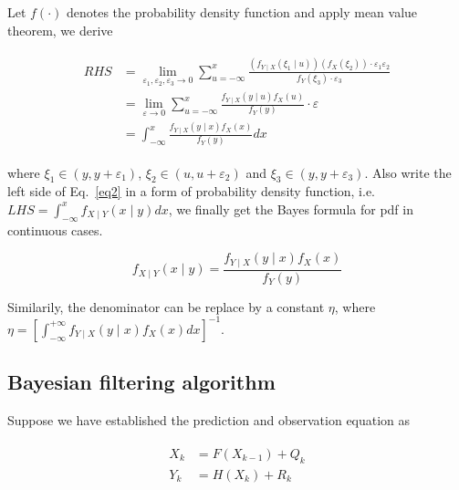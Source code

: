 \documentclass[conference]{IEEEtran}
\begin{document}
	Let $f(\cdot )$ denotes the probability density function and apply mean value theorem, we derive
	
	\begin{equation}
	\begin{split}
	\begin{aligned}
	RHS&=\lim_{\varepsilon_{1}, \varepsilon_{2}, \varepsilon_{3} \rightarrow 0}\sum_{u=-\infty}^{x} \frac{(f_{Y\mid X}(\xi _{1}\mid u)) (f_{X}(\xi _{2}))\cdot \varepsilon_{1} \varepsilon_{2}}{f_{Y}
		(\xi _{3})\cdot \varepsilon_{3}}\\
	&=\lim_{\varepsilon \rightarrow 0}\sum_{u=-\infty}^{x}\frac{f_{Y\mid X}(y\mid u)f_{X}(u)}{f_{Y}(y)}\cdot \varepsilon\\ 
	&=\int_{-\infty}^{x}\frac{f_{Y\mid X}(y\mid x)f_{X}(x)}{f_{Y}(y)}dx
	\nonumber
	\end{aligned}
	\end{split}
	\end{equation}
	
	where $\xi _{1}\in (y,y+\varepsilon_{1})$, $\xi _{2}\in (u,u+\varepsilon_{2})$ and $\xi _{3}\in (y,y+\varepsilon_{3})$. Also write the left side of Eq.~\ref{eq2} in a form of probability density function, i.e. $LHS=\int_{-\infty}^{x}f_{X\mid Y}(x\mid y)dx$, we finally get the Bayes formula for pdf in continuous cases.
	
	\begin{equation}
		f_{X\mid Y}(x\mid y)=\frac{f_{Y\mid X}(y\mid x)f_{X}(x)}{f_{Y}(y)}
		\label{eq3}
	\end{equation}
	
	Similarily, the denominator can be replace by a constant $\eta$, where $\eta=[\int_{-\infty}^{+\infty}f_{Y\mid X}(y\mid x)f_{X}(x)dx]^{-1}$. 
	
	\subsection{Bayesian filtering algorithm}
	
	Suppose we have established the prediction and observation equation as
	
	\begin{equation}
	\begin{split}
	\begin{aligned}
	X_{k}&=F(X_{k-1})+Q_{k}\\
	Y_{k}&=H(X_{k})+R_{k}
	\label{eq4}
	\end{aligned}
	\end{split}
	\end{equation}
	
\end{document}
